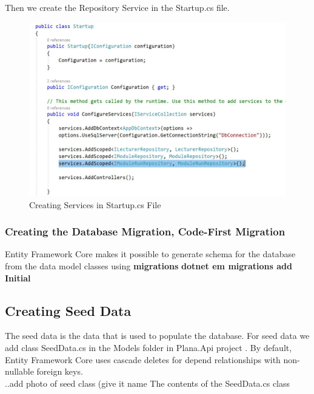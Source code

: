 \documentclass{scrartcl}
\begin{document}
\newpage

Then we create the Repository Service in the Startup.cs file.\\

\begin{figure}[h]
\centering
\includegraphics[width=150mm]{report_img/add_scoped_rep.JPG}
\caption{Creating Services in Startup.cs File}
\label{blabla}
\end{figure}

 

\cite{core3}

\subsubsection{Creating the Database Migration, Code-First Migration}
Entity Framework Core makes it possible to generate schema for the database from the data model classes using \textbf{migrations}
\textbf{dotnet em migrations add Initial} 
\cite{core3}



\subsection{Creating Seed Data}
The seed data is the data that is used to populate the database. For seed data we add class SeedData.cs in the Models folder in Plana.Api project \cite{core3}.
By default, Entity Framework Core uses cascade deletes for depend relationships with non-nullable foreign keys. \cite{efa} \\
..add photo of seed class (give it name The contents of the SeedData.cs class \\
\end{document}
